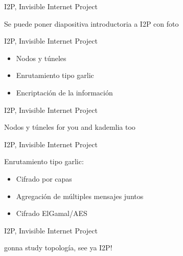 \documentclass[spanish]{beamer}
\begin{document}
\begin{frame}{I2P, Invisible Internet Project}
	
Se puede poner diapositiva introductoria a I2P con foto	
	
\end{frame}




\begin{frame}{I2P, Invisible Internet Project}
	
	
\begin{itemize}
	\item Nodos y túneles
	\item Enrutamiento tipo garlic
	\item Encriptación de la información
\end{itemize}	
	
\end{frame}






\begin{frame}{I2P, Invisible Internet Project}
	
	Nodos y túneles for you
	and kademlia too	
	
\end{frame}






\begin{frame}{I2P, Invisible Internet Project}
	
Enrutamiento tipo garlic:


\vspace{1.9em}


\begin{itemize}
	\item Cifrado por capas
	\item Agregación de múltiples mensajes juntos
	\item Cifrado ElGamal/AES
\end{itemize}
	
	
\end{frame}



\begin{frame}{I2P, Invisible Internet Project}

gonna study topología, see ya I2P!

\end{frame}
\end{document}
